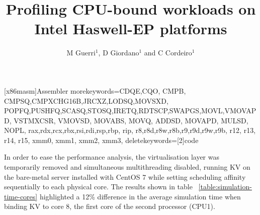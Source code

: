 \documentclass[a4paper]{jpconf}
\begin{document}
\title{Profiling CPU-bound workloads on Intel Haswell-EP platforms}

\author{M Guerri$^1$, D Giordano$^1$ and C Cordeiro$^1$}
\address{$^1$ CERN}


   [x86masm]{Assembler}
   {morekeywords={CDQE,CQO, CMPB, CMPSQ,CMPXCHG16B,JRCXZ,LODSQ,MOVSXD,
                  POPFQ,PUSHFQ,SCASQ,STOSQ,IRETQ,RDTSCP,SWAPGS,MOVL,VMOVAPD,
                  VSTMXCSR, VMOVSD, MOVABS, MOVQ, ADDSD, MOVAPD, MULSD, NOPL,
                  rax,rdx,rcx,rbx,rsi,rdi,rsp,rbp, rip,
                  r8,r8d,r8w,r8b,r9,r9d,r9w,r9b, r12, r13, r14, r15,
                  xmm0, xmm1, xmm2, xmm3},
    deletekeywords=[2]{code}
    }
\newcommand\realnumberstyle[1]{}

\makeatletter
\newcommand{\zebra}[3]{%
    {\realnumberstyle{#3}}%
    \begingroup
    \lst@basicstyle
    \ifodd\value{lstnumber}%
        \color{#1}%
    \else
        \color{#2}%
    \fi
        \rlap{\hspace*{\lst@numbersep}%
        \color@block{\linewidth}{\ht\strutbox}{\dp\strutbox}%
        }%
    \endgroup
}
\makeatother




In order to ease the performance analysis, the virtualisation layer was
temporarily removed and simultaneous multithreading disabled, running KV on
the bare-metal server installed with CentOS 7 while setting scheduling affinity sequentially to each physical
core. The results shown in table ~\ref{table:simulation-time-cores}
highlighted a 12\% difference in the average simulation
time when binding KV to core 8, the first core of the second processor (CPU1).
\end{document}
